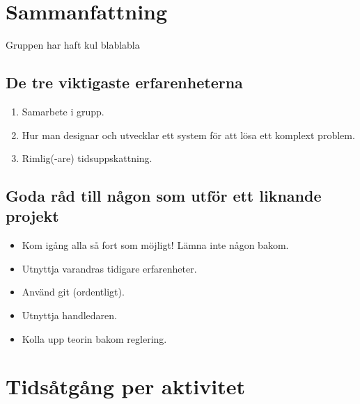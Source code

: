 \documentclass[10pt,oneside,swedish]{lips}
\begin{document}
\section{Sammanfattning}

Gruppen har haft kul blablabla

\subsection{De tre viktigaste erfarenheterna}

\begin{enumerate}
	\item Samarbete i grupp.
	\item Hur man designar och utvecklar ett system för att lösa ett komplext
		problem.
	\item Rimlig(-are) tidsuppskattning.
\end{enumerate}

\subsection{Goda råd till någon som utför ett liknande projekt}

\begin{itemize}
	\item Kom igång alla så fort som möjligt! Lämna inte någon bakom.
	\item Utnyttja varandras tidigare erfarenheter.
	\item Använd git (ordentligt).
	\item Utnyttja handledaren.
	\item Kolla upp teorin bakom reglering.
\end{itemize}
\appendix
\section{Tidsåtgång per aktivitet}
\end{document}
